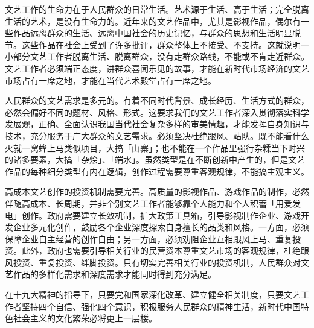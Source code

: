 文艺工作的生命力在于人民群众的日常生活。艺术源于生活、高于生活；完全脱离生活的艺术，是没有生命力的。近年来的文艺作品中，尤其是影视作品，偶尔有一些作品远离群众的生活、远离中国社会的历史记忆，与群众的思想和生活明显脱节。这些作品在社会上受到了许多批评，群众整体上不接受、不支持。这就说明一小部分文艺工作者脱离生活、脱离群众，没有走群众路线，不能或不肯走近群众。文艺工作者必须端正态度，讲群众喜闻乐见的故事，才能在新时代市场经济的文艺市场占有一席之地，才能在当代艺术殿堂占有一席之地。

人民群众的文艺需求是多元的。有着不同时代背景、成长经历、生活方式的群众，必然会偏好不同的题材、风格、形式。这要求我们的文艺工作者深入贯彻落实科学发展观，正确、全面认识我国当代社会复杂多样的审美情趣，才能发挥自身知识与技术，充分服务于广大群众的文艺需求。必须坚决杜绝跟风、站队。既不能看什么火就一窝蜂上马类似项目，大搞「山寨」；也不能在一个作品里强行杂糅当下时兴的诸多要素，大搞「杂烩」、「端水」。虽然类型是在不断创新中产生的，但是文艺作品的每种细分类型有内在逻辑，创作过程需要尊重客观规律，不能搞主观主义。

高成本文艺创作的投资机制需要完善。高质量的影视作品、游戏作品的制作，必然伴随高成本、长周期，并非个别文艺工作者能够靠个人能力和个人积蓄「用爱发电」创作。政府需要建立长效机制，扩大政策工具箱，引导影视制作企业、游戏开发企业多元化创作，鼓励各个企业深度探索自身擅长的品类和风格。一方面，必须保障企业自主经营的创作自由；另一方面，必须劝阻企业互相跟风上马、重复投资。此外，政府也需要引导相关行业的民营资本尊重文艺市场的客观规律，杜绝跟风投资、重复投资、绊脚投资。只有切实完善相关行业的投资机制，人民群众对文艺作品的多样化需求和深度需求才能同时得到充分满足。

在十九大精神的指导下，只要党和国家深化改革、建立健全相关制度，只要文艺工作者坚持四个自信、强化四个意识，积极服务人民群众的精神生活，新时代中国特色社会主义的文化繁荣必将更上一层楼。










